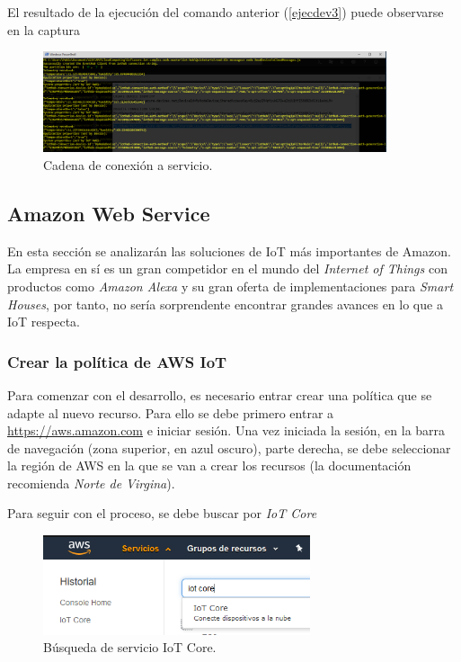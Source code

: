 \documentclass[english,runningheads,a4paper]{llncs}[2018/03/10]
\begin{document}
El resultado de la ejecución del comando anterior
(\hyperref[ejecdev3]{\ref{ejecdev3}}) puede observarse en la captura 

\begin{figure}[h!]
 \centering
 \includegraphics[width=0.9\textwidth]{./IoT/MicrosoftAzure/5-4_read_telemetry.png}
 \caption{Cadena de conexión a servicio.}
 \label{nodeser}
\end{figure}

\subsection*{Amazon Web Service}
En esta sección se analizarán las soluciones de IoT más importantes de Amazon.
La empresa en sí es un gran competidor en el mundo del \textit{Internet of
Things} con productos como \textit{Amazon Alexa} y su gran oferta de
implementaciones para \textit{Smart Houses}, por tanto, no sería sorprendente
encontrar grandes avances en lo que a IoT respecta.  

\subsubsection{Crear la política de AWS IoT}

Para comenzar con el desarrollo, es necesario entrar crear una política que se
adapte al nuevo recurso. Para ello se debe primero entrar a  
\url{https://aws.amazon.com} e iniciar sesión. Una vez iniciada la sesión, en la
barra de navegación (zona superior, en azul oscuro), parte derecha, se debe
seleccionar la región de AWS en la que se van a crear los recursos (la
documentación recomienda \textit{Norte de Virgina}).

Para seguir con el proceso, se debe buscar por \textit{IoT Core} 

\begin{figure}[h!]
 \centering
 \includegraphics[width=0.7\textwidth]{./IoT/AWS/1-2_search_iot_core.png}
 \caption{Búsqueda de servicio IoT Core.}
 \label{search}
\end{figure}
\end{document}
